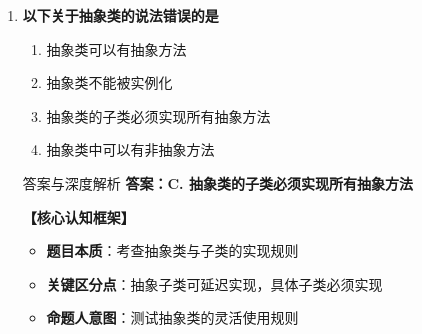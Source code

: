 \documentclass[12pt, a4paper]{ctexart}
\begin{document}
\begin{enumerate}[label=\textbf{\arabic*.}]
\begin{bluebox}{答案与深度解析}
		      \textbf{【命题趋势与实战策略】}

		      \textbf{考场秒杀三步法}：
		      \begin{enumerate}[label={}, nosep]
			      \item 看到"继承类"→extends
			      \item 看到"实现接口"→implements
			      \item 看到"实现继承"→找extends
		      \end{enumerate}

		      \textbf{记忆口诀}：
		      \begin{itemize}[label={}, nosep]
			      \item 类继承用extends，单根继承是规则
			      \item 接口实现implements，多实现也允许
		      \end{itemize}

		      \textbf{高频陷阱}：
		      \begin{enumerate}[label={}, nosep]
			      \item 混淆extends和implements
			      \item 误认为interface是继承关键字
			      \item 误认为abstract可替代extends
		      \end{enumerate}

		      \textbf{5秒决策技巧}：看到"实现继承"→extends
	      \end{bluebox}

	      \vspace{1em}

	\item \textbf{以下关于抽象类的说法错误的是}
	      \begin{enumerate}[label=\Alph*.]
		      \item 抽象类可以有抽象方法
		      \item 抽象类不能被实例化
		      \item 抽象类的子类必须实现所有抽象方法
		      \item 抽象类中可以有非抽象方法
	      \end{enumerate}

	      \begin{bluebox}{答案与深度解析}
		      \textbf{答案：C. 抽象类的子类必须实现所有抽象方法}

		      \textbf{【核心认知框架】}
		      \begin{itemize}[label={}, leftmargin=*, nosep]
			      \item \textbf{题目本质}：考查抽象类与子类的实现规则
			      \item \textbf{关键区分点}：抽象子类可延迟实现，具体子类必须实现
			      \item \textbf{命题人意图}：测试抽象类的灵活使用规则
		      \end{itemize}


\end{bluebox}
\end{enumerate}
\end{document}
